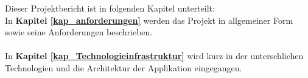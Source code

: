 Dieser Projektbericht ist in folgenden Kapitel unterteilt:\\
In \textbf{Kapitel \ref{kap_anforderungen}} werden das Projekt in allgemeiner Form sowie seine Anforderungen beschrieben.
\\\\
In \textbf{Kapitel \ref{kap_Technologieinfrastruktur}} wird kurz in der unterschlichen Technologien und die Architektur der Applikation eingegangen.
\\\\
